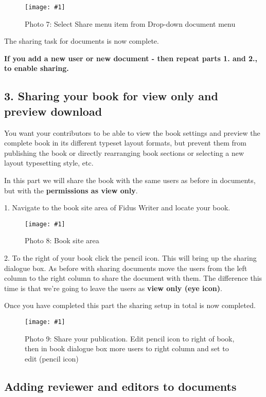 \documentclass{article}
\newlength{\imgwidth}
\newcommand\scaledgraphics[2]{%
                
\settowidth{\imgwidth}{\texttt{[image: \#1]}}%
                
\setlength{\imgwidth}{\minof{\imgwidth}{#2\textwidth}}%
                
\texttt{[image: \#1]}%
                
}
\begin{document}
\begin{figure}
\scaledgraphics{2b3de32d-4d3e-4e7c-9161-6d7d37b1c232.png}{1}
\caption*{Photo 7: Select Share menu item from Drop-down document menu}\label{F25716331}
\end{figure}


The sharing task for documents is now complete.


\textbf{If you add a new user or new document - then repeat parts 1. and 2., to enable sharing.}


\subsection{3. Sharing your book for view only and preview download}\label{H6251349}



You want your contributors to be able to view the book settings and preview the complete book in its different typeset layout formats, but prevent them from publishing the book or directly rearranging book sections or selecting a new layout typesetting style, etc.


In this part we will share the book with the same users as before in documents, but with the \textbf{permissions as view only}.


1. Navigate to the book site area of Fidus Writer and locate your book.

\begin{figure}
\scaledgraphics{a0f1beec-79fa-4ed4-bc58-9c22e9536863.png}{1}
\caption*{Photo 8: Book site area}\label{F66888411}
\end{figure}


2. To the right of your book click the pencil icon. This will bring up the sharing dialogue box. As before with sharing documents move the users from the left column to the right column to share the document with them. The difference this time is that we're going to leave the users as \textbf{view only (eye icon)}.


Once you have completed this part the sharing setup in total is now completed.

\begin{figure}
\scaledgraphics{b41a1892-6720-486f-8b11-e06d46aa69ec.png}{1}
\caption*{Photo 9: Share your publication. Edit pencil icon to right of book, then in book dialogue box more users to right column and set to edit (pencil icon)}\label{F29566181}
\end{figure}


\subsection{Adding reviewer and editors to documents}\label{H5018454}
\end{document}
